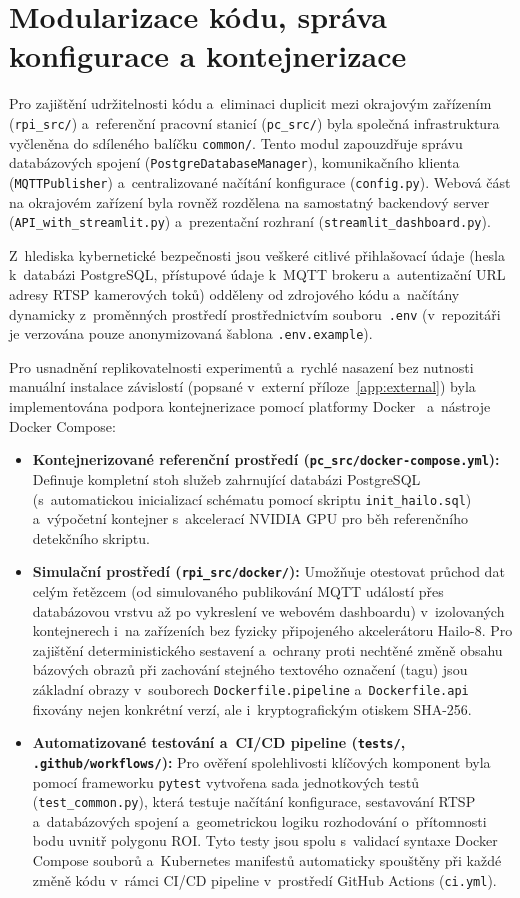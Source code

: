 \section{Modularizace kódu, správa konfigurace a kontejnerizace}
Pro zajištění udržitelnosti kódu a~eliminaci duplicit mezi okrajovým zařízením (\texttt{rpi\_src/}) a~referenční pracovní stanicí (\texttt{pc\_src/}) byla společná infrastruktura vyčleněna do sdíleného balíčku \texttt{common/}. Tento modul zapouzdřuje správu databázových spojení (\texttt{PostgreDatabaseManager}), komunikačního klienta (\texttt{MQTTPublisher}) a~centralizované načítání konfigurace (\texttt{config.py}). Webová část na okrajovém zařízení byla rovněž rozdělena na samostatný backendový server (\texttt{API\_with\_streamlit.py}) a~prezentační rozhraní (\texttt{streamlit\_dashboard.py}).

Z~hlediska kybernetické bezpečnosti jsou veškeré citlivé přihlašovací údaje (hesla k~databázi PostgreSQL, přístupové údaje k~MQTT brokeru a~autentizační URL adresy \acs{RTSP} kamerových toků) odděleny od zdrojového kódu a~načítány dynamicky z~proměnných prostředí prostřednictvím souboru~\texttt{.env} (v~repozitáři je verzována pouze anonymizovaná šablona \texttt{.env.example}).

Pro usnadnění replikovatelnosti experimentů a~rychlé nasazení bez nutnosti manuální instalace závislostí (popsané v~externí příloze~\ref{app:external}) byla implementována podpora kontejnerizace pomocí platformy Docker~\cite{docker_docs} a~nástroje Docker Compose:
\begin{itemize}
    \item \textbf{Kontejnerizované referenční prostředí (\texttt{pc\_src/docker-compose.yml}):} Definuje kompletní stoh služeb zahrnující databázi PostgreSQL (s~automatickou inicializací schématu pomocí skriptu \texttt{init\_hailo.sql}) a~výpočetní kontejner s~akcelerací NVIDIA GPU pro běh referenčního detekčního skriptu. 
    \item \textbf{Simulační prostředí (\texttt{rpi\_src/docker/}):} Umožňuje otestovat průchod dat celým řetězcem (od simulovaného publikování MQTT událostí přes databázovou vrstvu až po vykreslení ve webovém dashboardu) v~izolovaných kontejnerech i~na zařízeních bez fyzicky připojeného akcelerátoru Hailo-8. Pro zajištění deterministického sestavení a~ochrany proti nechtěné změně obsahu bázových obrazů při zachování stejného textového označení (tagu) jsou základní obrazy v~souborech \texttt{Dockerfile.pipeline} a~\texttt{Dockerfile.api} fixovány nejen konkrétní verzí, ale i~kryptografickým otiskem SHA-256.
    \item \textbf{Automatizované testování a~CI/CD pipeline (\texttt{tests/}, \texttt{.github/workflows/}):} Pro ověření spolehlivosti klíčových komponent byla pomocí frameworku \texttt{pytest} vytvořena sada jednotkových testů (\texttt{test\_common.py}), která testuje načítání konfigurace, sestavování RTSP a~databázových spojení a~geometrickou logiku rozhodování o~přítomnosti bodu uvnitř polygonu \acs{ROI}. Tyto testy jsou spolu s~validací syntaxe Docker Compose souborů a~Kubernetes manifestů automaticky spouštěny při každé změně kódu v~rámci CI/CD pipeline v~prostředí GitHub Actions (\texttt{ci.yml}).
\end{itemize}

